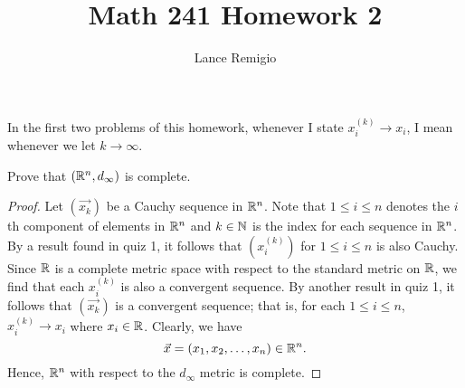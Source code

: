 \documentclass[a4paper]{article}
\title{Math 241 Homework 2}
\author{Lance Remigio}
\begin{document}
\maketitle

\begin{remark}
    In the first two problems of this homework, whenever I state \( {x}_{i}^{(k)} \to {x}_{i} \), I mean whenever we let \( k \to \infty  \).
\end{remark}
\begin{problem}
    Prove that \( (\mathbb{R}^{n}, {d}_{\infty }) \) is complete.
\end{problem}
\begin{proof}
    Let \( (\vec{ {x}_{k} } ) \) be a Cauchy sequence in \( \mathbb{R}^{n} \). Note that \( 1 \leq i \leq n  \) denotes the \( i \)th component of elements in \( \mathbb{R}^{n} \) and \( k \in \mathbb{N} \) is the index for each sequence in \( \mathbb{R}^{n} \). By a result found in quiz 1, it follows that \( ({x}_{i}^{(k)}) \) for \( 1 \leq i \leq n  \) is also Cauchy. Since \( \mathbb{R}  \) is a complete metric space with respect to the standard metric on \( \mathbb{R}  \), we find that each \( {x}_{i}^{(k)} \) is also a convergent sequence. By another result in quiz 1, it follows that \( (\vec{ {x}_{k} } ) \) is a convergent sequence; that is, for each \( 1 \leq i \leq n  \), \( {x}_{i}^{(k)} \to {x}_{i} \) where \( {x}_{i} \in \mathbb{R}  \). Clearly, we have 
    \[  \vec{ x } =  ({x}_{1}, {x}_{2}, \dots, {x}_{n} ) \in \mathbb{R}^{n}. \]
    Hence, \( \mathbb{R}^{n} \) with respect to the \( {d}_{\infty } \) metric is complete.
\end{proof}
\end{document}

